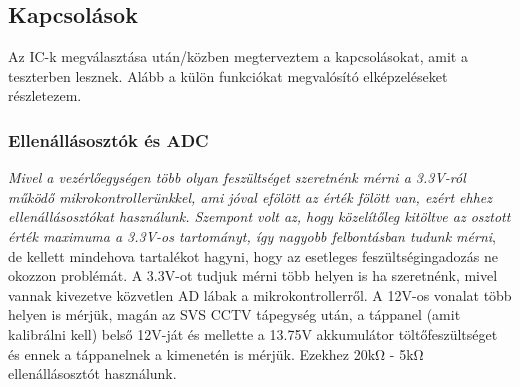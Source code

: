 \documentclass[a4paper, 12pt]{article}
\newcommand{\tab}{\hspace*{1em}}
\begin{document}
\subsection{Kapcsolások}
Az IC-k megválasztása után/közben megterveztem a kapcsolásokat, amit a teszterben lesznek. Alább a külön funkciókat megvalósító elképzeléseket részletezem.
\subsubsection{Ellenállásosztók és ADC}
\emph{\tab Mivel a vezérlőegységen több olyan feszültséget szeretnénk mérni a 3.3V-ról működő mikrokontrollerünkkel, ami jóval efölött az érték fölött van, ezért ehhez ellenállásosztókat használunk. Szempont volt az, hogy közelítőleg kitöltve az osztott érték maximuma a 3.3V-os tartományt, így nagyobb felbontásban tudunk mérni}, de kellett mindehova tartalékot hagyni, hogy az esetleges feszültségingadozás ne okozzon problémát. A 3.3V-ot tudjuk mérni több helyen is ha szeretnénk, mivel vannak kivezetve közvetlen AD lábak a mikrokontrollerről. A 12V-os vonalat több helyen is mérjük, magán az SVS CCTV tápegység után, a táppanel (amit kalibrálni kell) belső 12V-ját és mellette a 13.75V akkumulátor töltőfeszültséget és ennek a táppanelnek a kimenetén is mérjük. Ezekhez 20k\si{\ohm} - 5k\si{\ohm} ellenállásosztót használunk.
\end{document}
